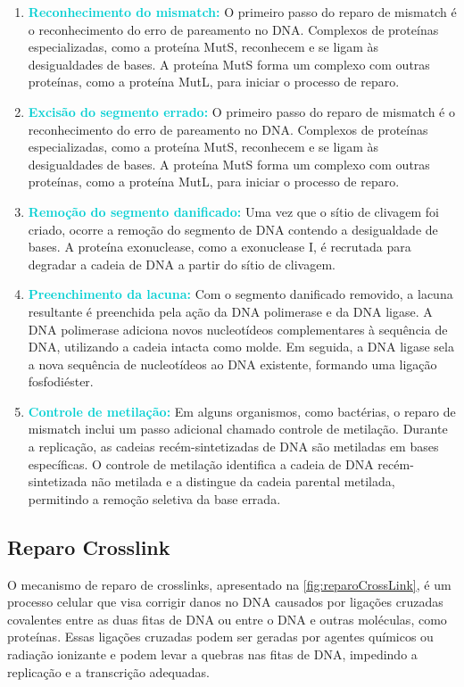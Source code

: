 \documentclass[11pt,a4paper]{article}
\begin{document}
	\begin{enumerate}[label=\textcolor{CarnationPink}{\arabic*${}^\circ $}]
		\item \textcolor{DarkTurquoise}{\textbf{Reconhecimento do mismatch:}} O primeiro passo do reparo de mismatch é o reconhecimento do erro de pareamento no DNA. Complexos de proteínas especializadas, como a proteína MutS, reconhecem e se ligam às desigualdades de bases. A proteína MutS forma um complexo com outras proteínas, como a proteína MutL, para iniciar o processo de reparo.
		\item \textcolor{DarkTurquoise}{\textbf{Excisão do segmento errado:}} O primeiro passo do reparo de mismatch é o reconhecimento do erro de pareamento no DNA. Complexos de proteínas especializadas, como a proteína MutS, reconhecem e se ligam às desigualdades de bases. A proteína MutS forma um complexo com outras proteínas, como a proteína MutL, para iniciar o processo de reparo.
		\item \textcolor{DarkTurquoise}{\textbf{Remoção do segmento danificado:}} Uma vez que o sítio de clivagem foi criado, ocorre a remoção do segmento de DNA contendo a desigualdade de bases. A proteína exonuclease, como a exonuclease I, é recrutada para degradar a cadeia de DNA a partir do sítio de clivagem.
		\item \textcolor{DarkTurquoise}{\textbf{Preenchimento da lacuna:}} Com o segmento danificado removido, a lacuna resultante é preenchida pela ação da DNA polimerase e da DNA ligase. A DNA polimerase adiciona novos nucleotídeos complementares à sequência de DNA, utilizando a cadeia intacta como molde. Em seguida, a DNA ligase sela a nova sequência de nucleotídeos ao DNA existente, formando uma ligação fosfodiéster.
		\item \textcolor{DarkTurquoise}{\textbf{Controle de metilação:}} Em alguns organismos, como bactérias, o reparo de mismatch inclui um passo adicional chamado controle de metilação. Durante a replicação, as cadeias recém-sintetizadas de DNA são metiladas em bases específicas. O controle de metilação identifica a cadeia de DNA recém-sintetizada não metilada e a distingue da cadeia parental metilada, permitindo a remoção seletiva da base errada.
	\end{enumerate}

\subsection*{Reparo Crosslink}
	
	O mecanismo de reparo de crosslinks, apresentado na \ref{fig:reparoCrossLink}, é um processo celular que visa corrigir danos no DNA causados por ligações cruzadas covalentes entre as duas fitas de DNA ou entre o DNA e outras moléculas, como proteínas. Essas ligações cruzadas podem ser geradas por agentes químicos ou radiação ionizante e podem levar a quebras nas fitas de DNA, impedindo a replicação e a transcrição adequadas.
\end{document}
